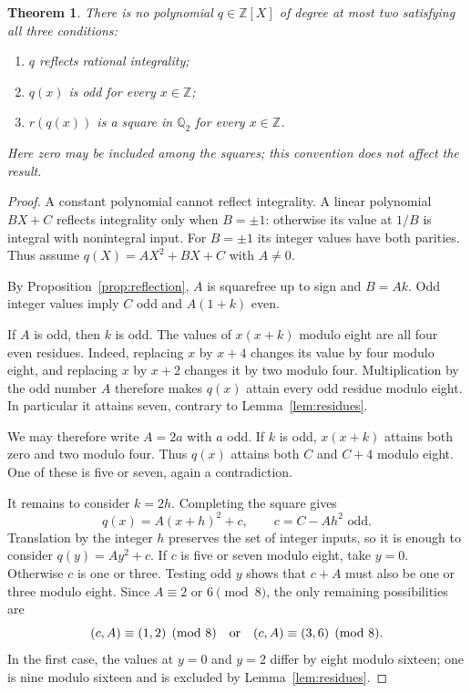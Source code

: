 \documentclass[11pt,a4paper]{article}
\newtheorem{theorem}{Theorem}[section]
\newcommand{\Q}{\mathbb Q}\newcommand{\Z}{\mathbb Z}
\begin{document}
\begin{theorem}\label{thm:main}
There is no polynomial $q\in\Z[X]$ of degree at most two
satisfying all three conditions:
\begin{enumerate}
\item $q$ reflects rational integrality;
\item $q(x)$ is odd for every $x\in\Z$;
\item $r(q(x))$ is a square in $\Q_2$ for every $x\in\Z$.
\end{enumerate}
Here zero may be included among the squares; this convention
does not affect the result.
\end{theorem}
\begin{proof}
A constant polynomial cannot reflect integrality. A linear
polynomial $BX+C$ reflects integrality only when $B=\pm1$:
otherwise its value at $1/B$ is integral with nonintegral input.
For $B=\pm1$ its integer values have both parities. Thus assume
$q(X)=AX^2+BX+C$ with $A\ne0$.

By Proposition~\ref{prop:reflection}, $A$ is squarefree up to
sign and $B=Ak$. Odd integer values imply $C$ odd and
$A(1+k)$ even.

If $A$ is odd, then $k$ is odd. The values of $x(x+k)$ modulo
eight are all four even residues. Indeed, replacing $x$ by $x+4$
changes its value by four modulo eight, and replacing $x$ by $x+2$
changes it by two modulo four. Multiplication by the odd number
$A$ therefore makes $q(x)$ attain every odd residue modulo eight.
In particular it attains seven, contrary to
Lemma~\ref{lem:residues}.

We may therefore write $A=2a$ with $a$ odd.
If $k$ is odd, $x(x+k)$ attains both zero and two modulo four.
Thus $q(x)$ attains both $C$ and $C+4$ modulo eight. One of
these is five or seven, again a contradiction.

It remains to consider $k=2h$. Completing the square gives
\[
                 q(x)=A(x+h)^2+c,\qquad c=C-Ah^2\text{ odd}.
\]
Translation by the integer $h$ preserves the set of integer inputs,
so it is enough to consider $q(y)=Ay^2+c$.
If $c$ is five or seven modulo eight, take $y=0$.
Otherwise $c$ is one or three. Testing odd $y$ shows that
$c+A$ must also be one or three modulo eight. Since
$A\equiv2$ or $6\pmod8$, the only remaining possibilities are
\[
 (c,A)\equiv(1,2)\pmod8
 \quad\hbox{or}\quad
 (c,A)\equiv(3,6)\pmod8.
\]
In the first case, the values at $y=0$ and $y=2$ differ by
eight modulo sixteen; one is nine modulo sixteen and is excluded
by Lemma~\ref{lem:residues}.


\end{proof}
\end{document}
